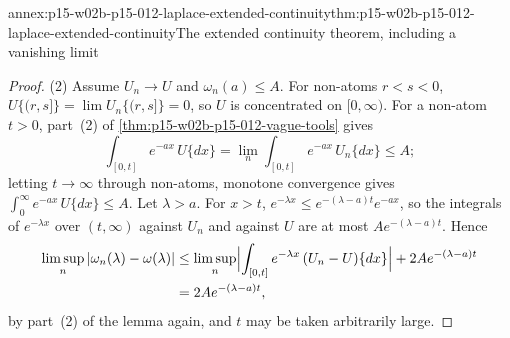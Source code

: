 \begin{annexitem}{annex:p15-w02b-p15-012-laplace-extended-continuity}{thm:p15-w02b-p15-012-laplace-extended-continuity}{The extended continuity theorem, including a vanishing limit}
\begin{proof}
(2) Assume \(U_n\to U\) and \(\omega_n(a)\leq A\). For non-atoms \(r<s<0\),
\(U\{(r,s]\}=\lim U_n\{(r,s]\}=0\), so \(U\) is concentrated on
\([0,\infty)\). For a non-atom \(t>0\), part~(2) of
\cref{thm:p15-w02b-p15-012-vague-tools} gives
\[
 \int_{[0,t]}e^{-ax}\,U\{dx\}=\lim_n\int_{[0,t]}e^{-ax}\,U_n\{dx\}\leq A ;
\]
letting \(t\to\infty\) through non-atoms, monotone convergence gives
\(\int_0^\infty e^{-ax}\,U\{dx\}\leq A\). Let \(\lambda>a\). For \(x>t\),
\(e^{-\lambda x}\leq e^{-(\lambda-a)t}e^{-ax}\), so the integrals of
\(e^{-\lambda x}\) over \((t,\infty)\) against \(U_n\) and against \(U\) are
at most \(Ae^{-(\lambda-a)t}\). Hence
\[
 \begin{aligned}
 \limsup_n|\omega_n(\lambda)-\omega(\lambda)|
   &\leq\limsup_n\Bigl|\int_{[0,t]}e^{-\lambda x}\,(U_n-U)\{dx\}\Bigr|+2Ae^{-(\lambda-a)t}\\
   &=2Ae^{-(\lambda-a)t},
 \end{aligned}
\]
by part~(2) of the lemma again, and \(t\) may be taken arbitrarily large.
\end{proof}
\end{annexitem}

